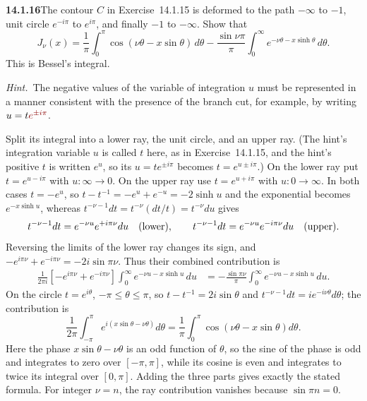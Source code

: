 \par\bigskip
\noindent\textbf{14.1.16}\quad The contour $C$ in Exercise~14.1.15 is
deformed to the path $-\infty$ to $-1$, unit circle $e^{-i\pi}$ to
$e^{i\pi}$, and finally $-1$ to $-\infty$. Show that
\[
J_{\nu}(x)=\frac{1}{\pi}\int_{0}^{\pi}\cos(\nu\theta-x\sin\theta)\,d\theta
-\frac{\sin\nu\pi}{\pi}\int_{0}^{\infty}e^{-\nu\theta-x\sinh\theta}\,d\theta.
\]
This is Bessel's integral.
\par\emph{Hint.}~The negative values of the variable of integration $u$
must be represented in a manner consistent with the presence of the
branch cut, for example, by writing $u=t\erratum{e^{\pm i\pi}}$.
\par{}
\solution
{}
Split its integral into a lower ray, the unit circle, and an upper
ray. (The hint's integration variable $u$ is called $t$ here, as in
Exercise~14.1.15, and the hint's positive $t$ is written $e^u$, so its
$u=te^{\pm i\pi}$ becomes $t=e^{u\pm i\pi}$.)
On the lower ray put $t=e^{u-i\pi}$ with $u:\infty\to0$.
On the upper ray use $t=e^{u+i\pi}$ with $u:0\to\infty$. In both
cases $t=-e^u$, so $t-t^{-1}=-e^u+e^{-u}=-2\sinh u$ and the
exponential becomes $e^{-x\sinh u}$, whereas
$t^{-\nu-1}dt=t^{-\nu}(dt/t)=t^{-\nu}du$ gives
\[
t^{-\nu-1}dt=e^{-\nu u}e^{+i\pi\nu}du
\quad\hbox{(lower)},\qquad
t^{-\nu-1}dt=e^{-\nu u}e^{-i\pi\nu}du
\quad\hbox{(upper)}.
\]
Reversing the limits of the lower ray changes its sign, and
$-e^{i\pi\nu}+e^{-i\pi\nu}=-2i\sin\pi\nu$. Thus their combined
contribution is
\begin{align*}
\frac1{2\pi i}\left[-e^{i\pi\nu}+e^{-i\pi\nu}\right]
 \int_0^\infty e^{-\nu u-x\sinh u}\,du
&=-\frac{\sin\pi\nu}{\pi}
 \int_0^\infty e^{-\nu u-x\sinh u}\,du.
\end{align*}
On the circle $t=e^{i\theta}$, $-\pi\le\theta\le\pi$, so
$t-t^{-1}=2i\sin\theta$ and $t^{-\nu-1}dt=ie^{-i\nu\theta}d\theta$;
the contribution is
\[
\frac1{2\pi}\int_{-\pi}^{\pi}e^{i(x\sin\theta-\nu\theta)}d\theta
=\frac1\pi\int_0^\pi\cos(\nu\theta-x\sin\theta)d\theta.
\]
Here the phase $x\sin\theta-\nu\theta$ is an odd function of
$\theta$, so the sine of the phase is odd and integrates to zero over
$[-\pi,\pi]$, while its cosine is even and integrates to twice its
integral over $[0,\pi]$. Adding the three parts gives exactly the
stated formula. For integer $\nu=n$,
the ray contribution vanishes because $\sin\pi n=0$.

